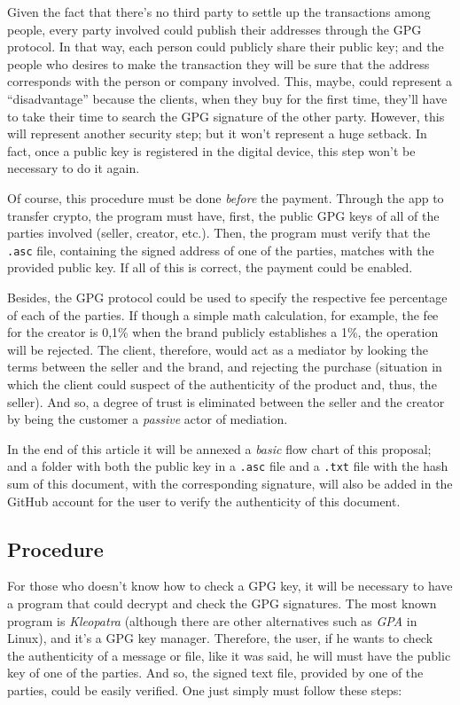 \documentclass[12pt,a4paper]{article}
\begin{document}
Given the fact that there's no third party to settle up the transactions among people, every party involved could publish their addresses through the GPG protocol. In that way, each person could publicly share their public key; and the people who desires to make the transaction they will be sure that the address corresponds with the person or company involved. This, maybe, could represent a “disadvantage” because the clients, when they buy for the first time, they'll have to take their time to search the GPG signature of the other party. However, this will represent another security step; but it won't represent a huge setback. In fact, once a public key is registered in the digital device, this step won't be necessary to do it again.

Of course, this procedure must be done \textit{before} the payment. Through the app to transfer crypto, the program must have, first, the public GPG keys of all of the parties involved (seller, creator, etc.). Then, the program must verify that the \texttt{.asc} file, containing the signed address of one of the parties, matches with the provided public key. If all of this is correct, the payment could be enabled.

Besides, the GPG protocol could be used to specify the respective fee percentage of each of the parties. If though a simple math calculation, for example, the fee for the creator is 0,1\% when the brand publicly establishes a 1\%, the operation will be rejected. The client, therefore, would act as a mediator by looking the terms between the seller and the brand, and rejecting the purchase (situation in which the client could suspect of the authenticity of the product and, thus, the seller). And so, a degree of trust is eliminated between the seller and the creator by being the customer a \textit{passive} actor of mediation.

In the end of this article it will be annexed a \textit{basic} flow chart of this proposal; and a folder with both the public key in a \texttt{.asc} file and a \texttt{.txt} file with the hash sum of this document, with the corresponding signature, will also be added in the GitHub account for the user to verify the authenticity of this document.

\subsection{Procedure}
For those who doesn't know how to check a GPG key, it will be necessary to have a program that could decrypt and check the GPG signatures. The most known program is \textit{Kleopatra} (although there are other alternatives such as \textit{GPA} in Linux), and it's a GPG key manager. Therefore, the user, if he wants to check the authenticity of a message or file, like it was said, he will must have the public key of one of the parties. And so, the signed text file, provided by one of the parties, could be easily verified. One just simply must follow these steps:
\end{document}
